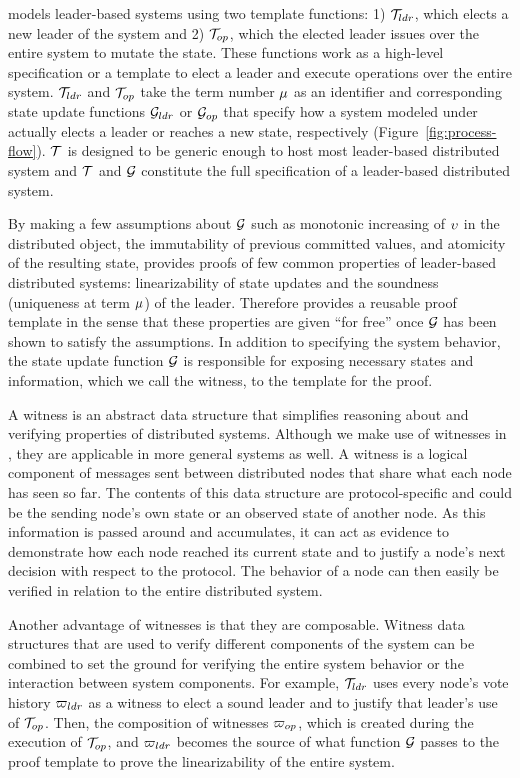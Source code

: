 {\sysname{} models leader-based systems using two template functions:
1) $\mathcal{T}_{ldr}$, which elects a new leader of the system and
2) $\mathcal{T}_{op}$, which the elected leader issues over the entire system
to mutate the state. These functions work as a high-level specification or a
template to elect a leader and execute operations over the entire system.
$\mathcal{T}_{ldr}$ and $\mathcal{T}_{op}$ take the term number $\mu$ as an identifier
and corresponding state update functions $\mathcal{G}_{ldr}$ or
$\mathcal{G}_{op}$ that specify how a system modeled under \sysname{}
actually elects a leader or reaches a new state, respectively (Figure~\ref{fig:process-flow}).
$\mathcal{T}$ is designed to be generic enough to host most
leader-based distributed system and $\mathcal{T}$ and $\mathcal{G}$
constitute the full specification of a leader-based distributed system.


By making a few assumptions  about $\mathcal{G}$
such as monotonic increasing of $\upsilon$ in the distributed object,
the immutability of previous committed values, and atomicity of the resulting
state, \sysname{} provides proofs of few common properties of leader-based distributed systems:
linearizability of state updates and the soundness (uniqueness at term $\mu$)
of the leader.
Therefore \sysname{} provides a reusable proof template in the sense that these properties
are given ``for free'' once $\mathcal{G}$ has been shown to satisfy the assumptions.
In addition to specifying the system behavior,
the state update function $\mathcal{G}$ is responsible for exposing necessary
states and information, which we call the witness, to the template for the proof.

A witness is an abstract data structure that simplifies reasoning about and
verifying properties of distributed systems. Although we make use of witnesses
in \sysname{}, they are applicable in more general systems as well. A witness is
a logical component of messages sent between distributed nodes that share what
each node has seen so far. The contents of this data structure are
protocol-specific and could be the sending node's own state or an observed state
of another node. As this information is passed around and accumulates, it can
act as evidence to demonstrate how each node reached its current state and to
justify a node's next decision with respect to the protocol. The behavior of a
node can then easily be verified in relation to the entire distributed system.

Another advantage of witnesses is that they are composable. Witness data
structures that are used to verify different components of the system can be
combined to set the ground for verifying the entire system behavior or the
interaction between system components. For example, $\mathcal{T}_{ldr}$ uses every
node's vote history ${\varpi_{ldr}}$ as a witness to elect a sound leader and to
justify that leader's use of $\mathcal{T}_{op}$. Then, the composition of witnesses
${\varpi_{op}}$, which is created during the execution of $\mathcal{T}_{op}$, and
${\varpi_{ldr}}$ becomes the source of what function $\mathcal{G}$ passes to
the proof template to prove the linearizability of the entire system.


}
